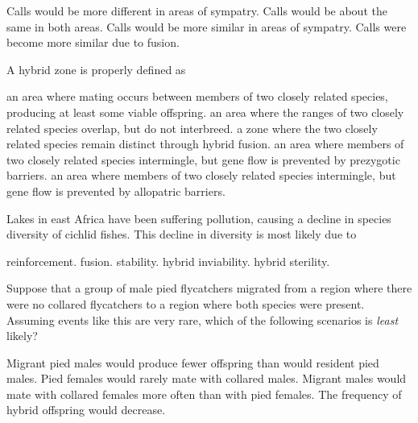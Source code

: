 \begin{choices}
\correctchoice Calls would be more different in areas of sympatry. %
\choice Calls would be about the same in both areas. %
\choice Calls would be more similar in areas of sympatry. %
\choice Calls were become more similar due to fusion. %
\end{choices}

\question
A hybrid zone is properly defined as 

\begin{choices}
\correctchoice an area where mating occurs between members of two closely related species, producing at least some viable offspring. %
\choice an area where the ranges of two closely related species overlap, but do not interbreed. %
\choice a zone where the two closely related species remain distinct through hybrid fusion. %
\choice an area where members of two closely related species intermingle, but gene flow is prevented by prezygotic barriers. %
\choice an area where members of two closely related species intermingle, but gene flow is prevented by allopatric barriers. %
\end{choices}


\question
Lakes in east Africa have been suffering pollution, causing a decline in species diversity of cichlid fishes. This decline in diversity is most likely due to

\begin{choices}
\choice reinforcement. %
\correctchoice fusion. %
\choice stability. %
\choice hybrid inviability. %
\choice hybrid sterility. %
\end{choices}

\question
Suppose that a group of male pied flycatchers migrated from a region where there were no collared flycatchers to a region where both species were present. Assuming events like this are very rare, which of the following scenarios is \emph{least} likely?

\begin{choices}
\choice Migrant pied males would produce fewer offspring than would resident pied males. %
\choice Pied females would rarely mate with collared males. %
\choice Migrant males would mate with collared females more often than with pied females. %
\choice The frequency of hybrid offspring would decrease. %
\end{choices}


